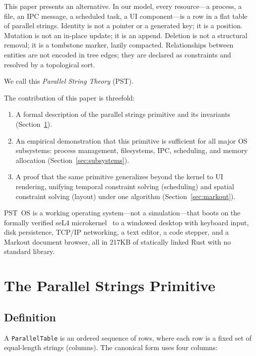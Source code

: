 \documentclass[11pt,a4paper]{article}
\begin{document}
This paper presents an alternative. In our model, every resource---a process, a file, an IPC message, a scheduled task, a UI component---is a row in a flat table of parallel strings. Identity is not a pointer or a generated key; it is a position. Mutation is not an in-place update; it is an append. Deletion is not a structural removal; it is a tombstone marker, lazily compacted. Relationships between entities are not encoded in tree edges; they are declared as constraints and resolved by a topological sort.

We call this \emph{Parallel String Theory} (PST).

The contribution of this paper is threefold:

\begin{enumerate}
  \item A formal description of the parallel strings primitive and its invariants (Section~\ref{sec:primitive}).
  \item An empirical demonstration that this primitive is sufficient for all major OS subsystems: process management, filesystems, IPC, scheduling, and memory allocation (Section~\ref{sec:subsystems}).
  \item A proof that the same primitive generalizes beyond the kernel to UI rendering, unifying temporal constraint solving (scheduling) and spatial constraint solving (layout) under one algorithm (Section~\ref{sec:markout}).
\end{enumerate}

PST~OS is a working operating system---not a simulation---that boots on the formally verified seL4 microkernel~\citep{sel4} to a windowed desktop with keyboard input, disk persistence, TCP/IP networking, a text editor, a code stepper, and a Markout document browser, all in 217KB of statically linked Rust with no standard library.

\section{The Parallel Strings Primitive}
\label{sec:primitive}

\subsection{Definition}

A \texttt{ParallelTable} is an ordered sequence of rows, where each row is a fixed set of equal-length strings (columns). The canonical form uses four columns:
\end{document}
